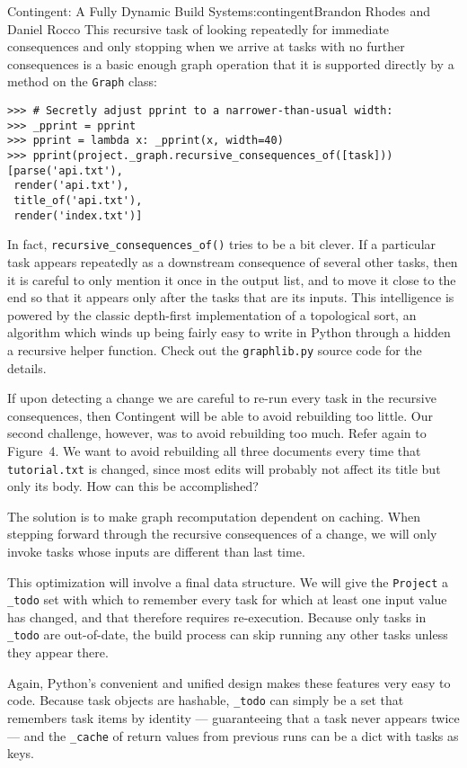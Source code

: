 \begin{aosachapter}{Contingent: A Fully Dynamic Build System}{s:contingent}{Brandon Rhodes and Daniel Rocco}
This recursive task of looking repeatedly for immediate consequences and
only stopping when we arrive at tasks with no further consequences is a
basic enough graph operation that it is supported directly by a method
on the \texttt{Graph} class:

\begin{verbatim}
>>> # Secretly adjust pprint to a narrower-than-usual width:
>>> _pprint = pprint
>>> pprint = lambda x: _pprint(x, width=40)
>>> pprint(project._graph.recursive_consequences_of([task]))
[parse('api.txt'),
 render('api.txt'),
 title_of('api.txt'),
 render('index.txt')]
\end{verbatim}

In fact, \texttt{recursive\_consequences\_of()} tries to be a bit
clever. If a particular task appears repeatedly as a downstream
consequence of several other tasks, then it is careful to only mention
it once in the output list, and to move it close to the end so that it
appears only after the tasks that are its inputs. This intelligence is
powered by the classic depth-first implementation of a topological sort,
an algorithm which winds up being fairly easy to write in Python through
a hidden a recursive helper function. Check out the \texttt{graphlib.py}
source code for the details.

If upon detecting a change we are careful to re-run every task in the
recursive consequences, then Contingent will be able to avoid rebuilding
too little. Our second challenge, however, was to avoid rebuilding too
much. Refer again to Figure~4. We want to avoid rebuilding all three
documents every time that \texttt{tutorial.txt} is changed, since most
edits will probably not affect its title but only its body. How can this
be accomplished?

The solution is to make graph recomputation dependent on caching. When
stepping forward through the recursive consequences of a change, we will
only invoke tasks whose inputs are different than last time.

This optimization will involve a final data structure. We will give the
\texttt{Project} a \texttt{\_todo} set with which to remember every task
for which at least one input value has changed, and that therefore
requires re-execution. Because only tasks in \texttt{\_todo} are
out-of-date, the build process can skip running any other tasks unless
they appear there.

Again, Python's convenient and unified design makes these features very
easy to code. Because task objects are hashable, \texttt{\_todo} can
simply be a set that remembers task items by identity --- guaranteeing
that a task never appears twice --- and the \texttt{\_cache} of return
values from previous runs can be a dict with tasks as keys.


\end{aosachapter}

